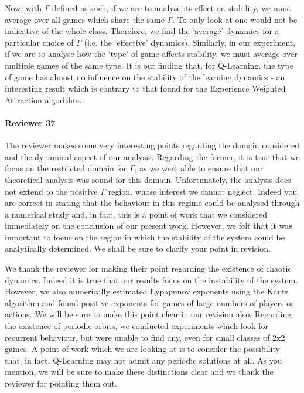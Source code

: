 \documentclass{article}
\begin{document}
Now, with $\Gamma$ defined as such, if we are to analyse its effect on stability, we must average
over all games which share the same $\Gamma$. To only look at one would not be indicative of the
whole class. Therefore, we find the `average' dynamics for a particular choice of $\Gamma$ (i.e.
the `effective' dynamics). Similarly, in our experiment, if we are to analyse how the `type' of game
affects stability, we must average over multiple games of the same type. It is our finding that, for
Q-Learning, the type of game has almost no influence on the stability of the learning dynamics - an
interesting result which is contrary to that found for the Experience Weighted Attraction algorithm.


\paragraph{Reviewer 37} %
\label{par:reviewer_37}

The reviewer makes some very interesting points regarding the domain considered and the dynamical
aspect of our analysis. Regarding the former, it is true that we focus on the restricted domain for
$\Gamma$, as we were able to ensure that our theoretical analysis was sound for this domain.
Unfortunately, the analysis does not extend to the positive $\Gamma$ region, whose interest we
cannot neglect. Indeed you are correct in stating that the behaviour in this regime could be
analysed through a numerical study and, in fact, this is a point of work that we considered
immediately on the conclusion of our present work. However, we felt that it was important to focus
on the region in which the stability of the system could be analytically determined. We shall be
sure to clarify your point in revision.

We thank the reviewer for making their point regarding the existence of chaotic dynamics. Indeed it
is true that our results focus on the instability of the system. However, we also numerically
estimated Lypapunov exponents using the Kantz algorithm and found positive exponents for games of
large numbers of players or actions. We will be sure to make this point clear in our revision also.
Regarding the existence of periodic orbits, we conducted experiments which look for recurrent
behaviour, but were unable to find any, even for small classes of 2x2 games. A point of work which
we are looking at is to consider the possibility that, in fact, Q-Learning may not admit any
periodic solutions at all. As you mention, we will be sure to make these distinctions clear and we
thank the reviewer for pointing them out.
\end{document}
